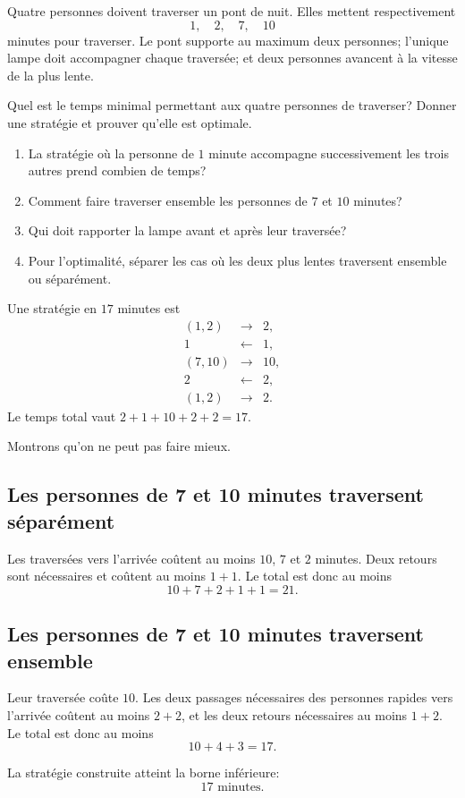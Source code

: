 \documentclass[11pt,a4paper]{article}
\begin{document}

\begin{statementbox}
Quatre personnes doivent traverser un pont de nuit. Elles mettent
respectivement
\[
1,\quad2,\quad7,\quad10
\]
minutes pour traverser. Le pont supporte au maximum deux personnes; l'unique
lampe doit accompagner chaque traversée; et deux personnes avancent à la
vitesse de la plus lente.

Quel est le temps minimal permettant aux quatre personnes de traverser? Donner
une stratégie et prouver qu'elle est optimale.
\end{statementbox}

\begin{hintsbox}
\begin{enumerate}
  \item La stratégie où la personne de $1$ minute accompagne successivement
  les trois autres prend combien de temps?
  \item Comment faire traverser ensemble les personnes de $7$ et $10$ minutes?
  \item Qui doit rapporter la lampe avant et après leur traversée?
  \item Pour l'optimalité, séparer les cas où les deux plus lentes traversent
  ensemble ou séparément.
\end{enumerate}
\end{hintsbox}

\correction

Une stratégie en $17$ minutes est
\[
\begin{array}{rcl}
(1,2)&\longrightarrow&2,\\
1&\longleftarrow&1,\\
(7,10)&\longrightarrow&10,\\
2&\longleftarrow&2,\\
(1,2)&\longrightarrow&2.
\end{array}
\]
Le temps total vaut $2+1+10+2+2=17$.

Montrons qu'on ne peut pas faire mieux.

\subsection*{Les personnes de 7 et 10 minutes traversent séparément}
Les traversées vers l'arrivée coûtent au moins $10$, $7$ et $2$ minutes. Deux
retours sont nécessaires et coûtent au moins $1+1$. Le total est donc au moins
\[
10+7+2+1+1=21.
\]

\subsection*{Les personnes de 7 et 10 minutes traversent ensemble}
Leur traversée coûte $10$. Les deux passages nécessaires des personnes rapides
vers l'arrivée coûtent au moins $2+2$, et les deux retours nécessaires au
moins $1+2$. Le total est donc au moins
\[
10+4+3=17.
\]

\begin{resultbox}
La stratégie construite atteint la borne inférieure:
\[
\boxed{17\text{ minutes}.}
\]
\end{resultbox}
\end{document}
